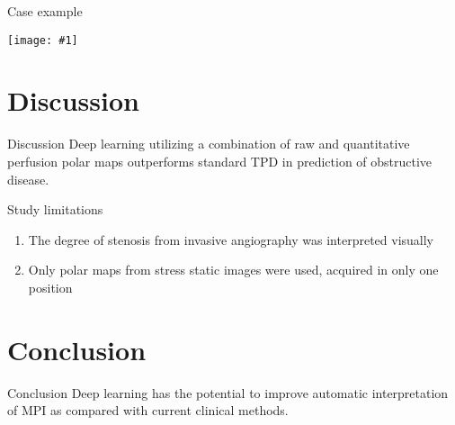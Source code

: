 \documentclass{beamer}
\newcommand*{\solo}[1]{\texttt{[image: \#1]}}
\begin{document}
\begin{frame}{Case example}
    \begin{center}
        \solo{4.eps}
    \end{center}
\end{frame}

\section{Discussion}
\begin{frame}{Discussion}
    Deep learning utilizing a combination of raw and quantitative perfusion
    polar maps outperforms standard TPD in prediction of obstructive disease.
\end{frame}

\begin{frame}{Study limitations}
    \begin{enumerate}
        \item
            The degree of stenosis from invasive angiography was interpreted
            visually
        \item
            Only polar maps from stress static images were used, acquired in
            only one position
    \end{enumerate}
\end{frame}

\section{Conclusion}
\begin{frame}{Conclusion}
    Deep learning has the potential to improve automatic interpretation of MPI
    as compared with current clinical methods.
\end{frame}
\end{document}
